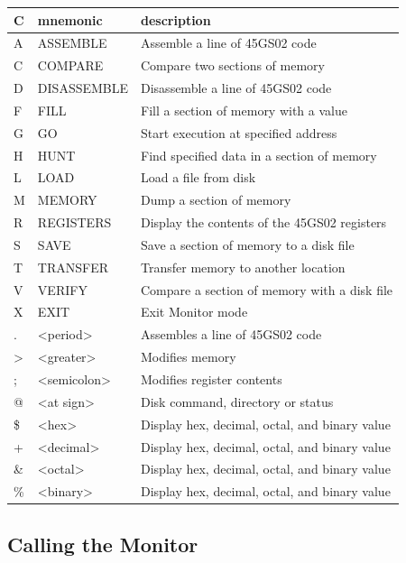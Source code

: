 {
\ttfamily
\setlength{\tabcolsep}{1mm}
\begin{tabular}{|l|l|l|}
\hline
C & mnemonic & description \\
\hline
A &     ASSEMBLE        & Assemble a line of 45GS02 code\\
C &     COMPARE         & Compare two sections of memory\\
D &     DISASSEMBLE     & Disassemble a line of 45GS02 code\\
F &     FILL            & Fill a section of memory with a value \\
G &     GO              & Start execution at specified address\\
H &     HUNT            & Find specified data in a section of memory\\
L &     LOAD            & Load a file from disk\\
M &     MEMORY          & Dump a section of memory\\
R &     REGISTERS       & Display the contents of the 45GS02 registers\\
S &     SAVE            & Save a section of memory to a disk file\\
T &     TRANSFER        & Transfer memory to another location\\
V &     VERIFY          & Compare a section of memory with a disk file\\
X &     EXIT            & Exit Monitor mode\\
\hline
 . &     <period>        & Assembles a line of 45GS02 code\\
 > &     <greater>       & Modifies memory\\
 ; &     <semicolon>     & Modifies register contents\\
 @ &     <at sign>       & Disk command, directory or status\\
\hline
\$ &     <hex>           & Display hex, decimal, octal, and binary value \\
 + &     <decimal>       & Display hex, decimal, octal, and binary value\\
\& &     <octal>         & Display hex, decimal, octal, and binary value\\
\% &     <binary>        & Display hex, decimal, octal, and binary value\\
\hline
\end{tabular}
}

\subsection {Calling the Monitor}

